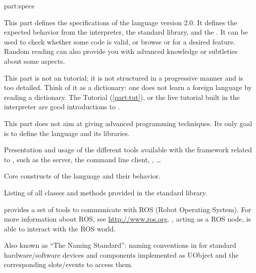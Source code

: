 
\begin{partDescription}{part:specs}
  {
    This part defines the specifications of the \us language version
    2.0. It defines the expected behavior from the \us interpreter,
    the standard library, and the \sdk. It can be used to check
    whether some code is valid, or browse \us or \Cxx \api for a
    desired feature. Random reading can also provide you with advanced
    knowledge or subtleties about some \us aspects.

    This part is not an \us tutorial; it is not structured in a
    progressive manner and is too detailed.  Think of it as a
    dictionary: one does not learn a foreign language by reading a
    dictionary. The \us Tutorial (\autoref{part:tut}), or the live \us
    tutorial built in the interpreter are good introductions to \us.

    This part does not aim at giving advanced programming
    techniques. Its only goal is to define the language and its
    libraries.
  }
\item[sec:tools]
  Presentation and usage of the different tools available with the
  \urbi framework related to \us, such as the \urbi server, the
  command line client, \umake, \ldots

\item[sec:lang]
  Core constructs of the language and their behavior.

\item[sec:stdlib]
  Listing of all classes and methods provided in the standard library.

\item[sec:specs:ros] \urbi provides a set of tools to communicate with ROS
  (Robot Operating System). For more information about ROS, see
  \url{http://www.ros.org}.  \urbi, acting as a ROS node, is able to
  interact with the ROS world.

\item[sec:naming]
  Also known as ``The \urbi Naming Standard'': naming conventions in
  for standard hardware/software devices and components implemented as
  UObject and the corresponding slots/events to access them.

\end{partDescription}


